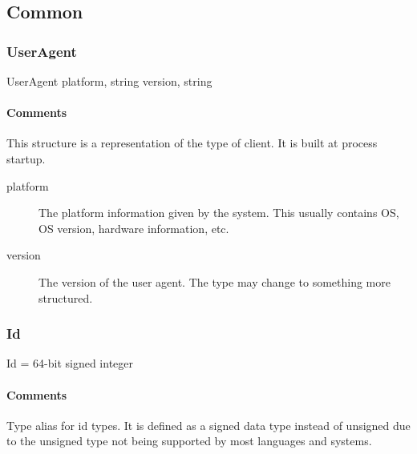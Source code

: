 \documentclass[a4paper,10pt]{article}
\begin{document}
\subsection{Common}
\label{sec:structure:common}

\subsubsection{UserAgent}

\begin{verbbox}
UserAgent
{
  platform, string
  version, string
}
\end{verbbox}
\begin{center}
\theverbbox
\end{center}

\begin{inparaitem}[ ]
 \item \infrastructure
\end{inparaitem}

\paragraph*{Comments}
This structure is a representation of the type of client. It is built at process startup.

\SpecialItem
\begin{description}
 \item[platform] The platform information given by the system. This usually contains OS, OS version, hardware information, etc.
 \item[version] The version of the user agent. The type may change to something more structured.
\end{description}

\subsubsection{Id}

\begin{verbbox}
Id = 64-bit signed integer
\end{verbbox}
\begin{center}
\theverbbox
\end{center}

\begin{inparaitem}[ ]
 \item \infrastructure
\end{inparaitem}

\paragraph*{Comments}
Type alias for id types. It is defined as a signed data type instead of unsigned due to the unsigned type not being supported by most languages and systems.
\end{document}
